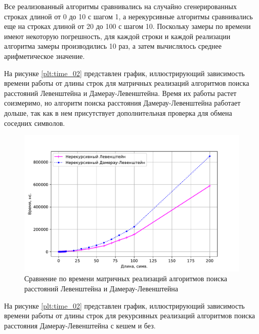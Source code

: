 Все реализованный алгоритмы сравнивались на случайно сгенерированных строках длиной от 0 до 10 с шагом 1, а нерекурсивные алгоритмы сравнивались еще на строках длиной от 20 до 100 с шагом 10. Поскольку замеры по времени имеют некоторую погрешность, для каждой строки и каждой реализации алгоритма замеры производились 10 раз, а затем вычислялось среднее арифметическое значение.

На рисунке \ref{plt:time_02} представлен график, иллюстрирующий зависимость времени работы от длины строк для матричных реализаций алгоритмов поиска расстояний Левенштейна и Дамерау-Левенштейна. Время их работы растет соизмеримо, но алгоритм поиска расстояния Дамерау-Левенштейна работает дольше, так как в нем присутствует дополнительная проверка для обмена соседних символов.

\begin{figure}[h]
	\centering
	\includegraphics[height=0.4\textheight, page=1]{img/figures.pdf}
	\caption{Сравнение по времени матричных реализаций алгоритмов поиска расстояний Левенштейна и Дамерау-Левенштейна}
	\label{plt:time_01}
\end{figure}

На рисунке \ref{plt:time_02} представлен график, иллюстрирующий зависимость времени работы от длины строк для рекурсивных реализаций алгоритмов поиска расстояния Дамерау-Левенштейна с кешем и без.

